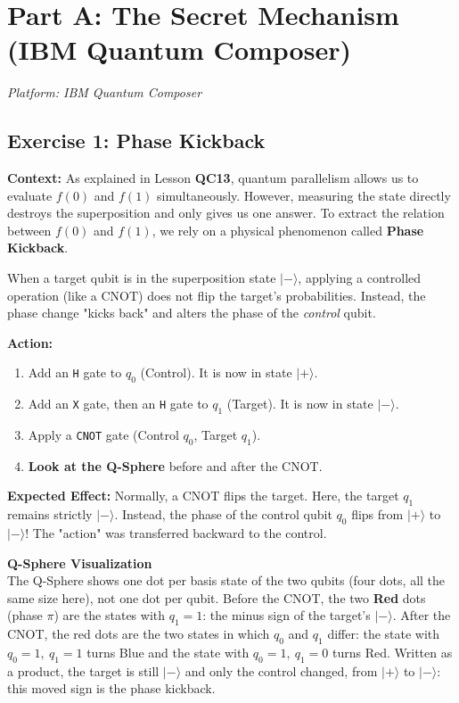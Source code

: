 \documentclass[a4paper,11pt]{article}
\begin{document}
\newpage

\section{Part A: The Secret Mechanism (IBM Quantum Composer)}
\textit{Platform: IBM Quantum Composer}

\subsection{Exercise 1: Phase Kickback}
\textbf{Context:} As explained in Lesson \textbf{QC13}, quantum parallelism allows us to evaluate $f(0)$ and $f(1)$ simultaneously. However, measuring the state directly destroys the superposition and only gives us one answer. To extract the relation between $f(0)$ and $f(1)$, we rely on a physical phenomenon called \textbf{Phase Kickback}. 

When a target qubit is in the superposition state $|-\rangle$, applying a controlled operation (like a CNOT) does not flip the target's probabilities. Instead, the phase change "kicks back" and alters the phase of the \textit{control} qubit.

\begin{studentbox}
\textbf{Action:}
\begin{enumerate}
    \item Add an \texttt{H} gate to $q_0$ (Control). It is now in state $|+\rangle$.
    \item Add an \texttt{X} gate, then an \texttt{H} gate to $q_1$ (Target). It is now in state $|-\rangle$.
    \item Apply a \texttt{CNOT} gate (Control $q_0$, Target $q_1$).
    \item \textbf{Look at the Q-Sphere} before and after the CNOT.
\end{enumerate}
\textbf{Expected Effect:}
Normally, a CNOT flips the target. Here, the target $q_1$ remains strictly $|-\rangle$. Instead, the phase of the control qubit $q_0$ flips from $|+\rangle$ to $|-\rangle$! The "action" was transferred backward to the control.
\end{studentbox}

\begin{composerbox}
\textbf{Q-Sphere Visualization}\\
The Q-Sphere shows one dot per basis state of the two qubits (four dots, all the same size here), not one dot per qubit. Before the CNOT, the two \textbf{Red} dots (phase $\pi$) are the states with $q_1 = 1$: the minus sign of the target's $|-\rangle$. After the CNOT, the red dots are the two states in which $q_0$ and $q_1$ differ: the state with $q_0 = 1,\ q_1 = 1$ turns Blue and the state with $q_0 = 1,\ q_1 = 0$ turns Red. Written as a product, the target is still $|-\rangle$ and only the control changed, from $|+\rangle$ to $|-\rangle$: this moved sign is the phase kickback.
\end{composerbox}
\end{document}

